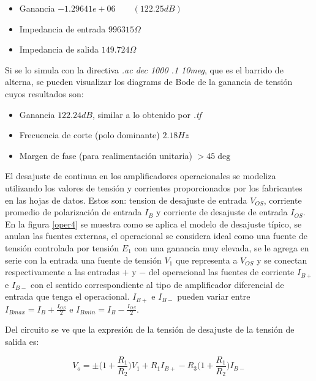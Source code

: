 \bigskip


\begin{itemize}
	\item Ganancia $-1.29641e+06 \quad \quad (122.25dB)$
	\item Impedancia de entrada $996315 \Omega$
	\item Impedancia de salida $149.724 \Omega$
	
\end{itemize} 



Si  se lo simula con la directiva \textit{.ac dec 1000 .1 10meg}, que es el barrido de alterna, se pueden visualizar los diagrams de Bode de la ganancia de tensión cuyos resultados son:

\bigskip

\begin{itemize}
	\item Ganancia $122.24dB$, similar a lo obtenido por \textit{.tf}
	\item Frecuencia de corte (polo dominante) $2.18Hz$
	\item Margen de fase (para realimentación unitaria) $> 45\deg$
	
\end{itemize} 

El desajuste de continua en los amplificadores operacionales se modeliza utilizando los valores de tensión y corrientes proporcionados por los fabricantes en las hojas de datos. Estos son: tension de desajuste de entrada $V_{OS}$, corriente promedio de polarización de entrada $I_B$ y corriente de desajuste de entrada $I_{OS}$. En la figura \ref{oper4} se muestra como se aplica el modelo de desajuste típico, se anulan las fuentes externas, el operacional se considera ideal como una fuente de tensión controlada por tensión $E_1$ con una ganancia muy elevada, se le agrega en serie con la entrada una fuente de tensión $V_1$ que representa a $V_{OS}$ y se conectan respectivamente a las entradas $+$ y $-$ del operacional las fuentes de corriente $I_{B+}$ e $I_{B-}$ con el sentido correspondiente al tipo de amplificador diferencial de entrada que tenga el operacional. $I_{B+}$ e $I_{B-}$ pueden variar entre $I_{Bmax}=I_B+\frac{I_{OS}}{2}$ e $I_{Bmin}=I_B- \frac{I_{OS}}{2}$. 

Del circuito se ve que la expresión de la tensión de desajuste de la tensión de salida es:

\begin{equation}\label{ecuop1}
	V_o=\pm \big(1+\displaystyle \frac{R_1}{R_2} )V_{1}+R_1I_{B+}-R_3\big(1+\displaystyle \frac{R_1}{R_2} )I_{B-}
\end{equation}

